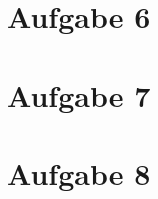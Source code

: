 \documentclass[
	fontsize=12pt,          %
	paper=a4,               %
	numbers=noenddot,       %
	listof=totoc,           %
	listof=entryprefix,     %
	listof=nochaptergap,    %
	bibliography=totoc,     %
	parskip=half            %
	openany                 %
]{scrbook}
\begin{document}
{\let\cleardoublepage\relax \chapter*{Aufgabe 6}}

\newpage

{\let\cleardoublepage\relax \chapter*{Aufgabe 7}}

\newpage

{\let\cleardoublepage\relax \chapter*{Aufgabe 8}}

\newpage

\end{document}

